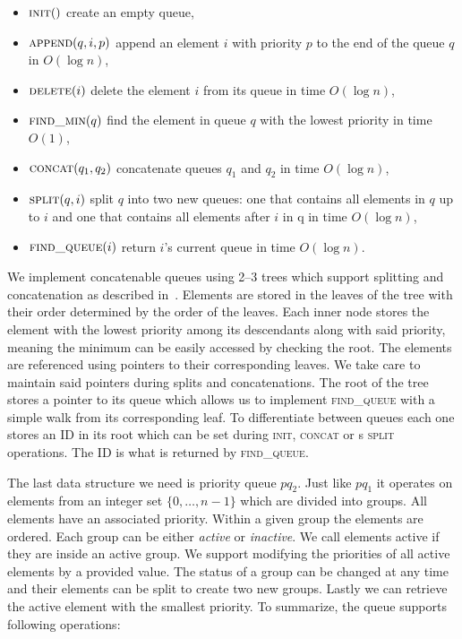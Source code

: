 \begin{itemize}
    \item $\textsc{init}()$ create an empty queue,
    \item $\textsc{append}(q, i, p)$ append an element $i$ with priority $p$ to the end of the queue $q$ in $O(\log n)$,
    \item $\textsc{delete}(i)$ delete the element $i$ from its queue in time $O(\log n)$,
    \item $\textsc{find\_min}(q)$ find the element in queue $q$ with the lowest priority in time $O(1)$,
    \item $\textsc{concat}(q_1, q_2)$ concatenate queues $q_1$ and $q_2$ in time $O(\log n)$,
    \item $\textsc{split}(q, i)$ split $q$ into two new queues: one that contains all elements in $q$ up to $i$ and one that contains all elements after $i$ in q in time $O(\log n)$,
    \item $\textsc{find\_queue}(i)$ return $i$'s current queue in time $O(\log n)$.
\end{itemize}

We implement concatenable queues using 2–3 trees which support splitting and concatenation as described in~\cite{aho1974design}. Elements are stored in the leaves of the tree with their order determined by the order of the leaves. Each inner node stores the element with the lowest priority among its descendants along with said priority, meaning the minimum can be easily accessed by checking the root. The elements are referenced using pointers to their corresponding leaves. We take care to maintain said pointers during splits and concatenations. The root of the tree stores a pointer to its queue which allows us to implement \textsc{find\_queue} with a simple walk from its corresponding leaf. To differentiate between queues each one stores an ID in its root which can be set during \textsc{init}, \textsc{concat} or s \textsc{split} operations. The ID is what is returned by \textsc{find\_queue}.

The last data structure we need is priority queue $pq_2$. Just like $pq_1$ it operates on elements from an integer set $\{0, \dots, n-1\}$ which are divided into groups. All elements have an associated priority. Within a given group the elements are ordered. Each group can be either \textit{active} or \textit{inactive}. We call elements active if they are inside an active group. We support modifying the priorities of all active elements by a provided value. The status of a group can be changed at any time and their elements can be split to create two new groups. Lastly we can retrieve the active element with the smallest priority. To summarize, the queue supports following operations:

